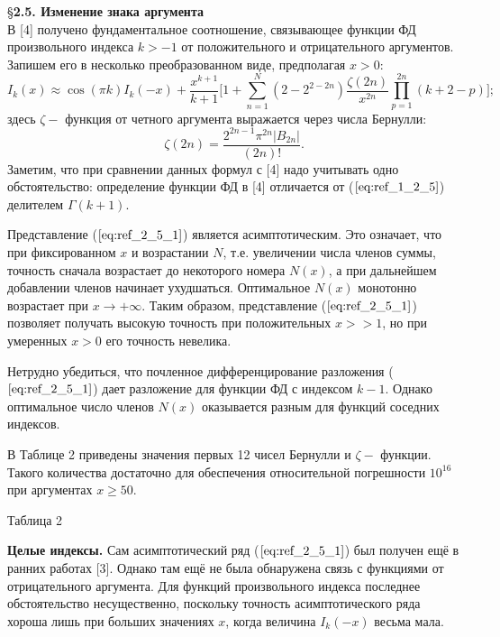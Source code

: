 \S \textbf{2.5. Изменение знака аргумента}
\\

В [4] получено фундаментальное соотношение, связывающее функции ФД
произвольного индекса $k > -1$ от положительного и отрицательного
аргументов. Запишем его в несколько преобразованном виде, предполагая
$x > 0$:
\begin{equation}
I_k(x) \approx \cos(\pi k)I_k(-x)+ \frac{x^{k+1}}{k+1}\Bigg[ 1+\sum\limits_{n=1}^N (2-2^{2-2n}) \frac{\zeta (2n)}{x^{2n}}  \prod\limits_{p=1}^{2n} (k+2-p) \Bigg];
\label{eq:ref_2_5_1}
\end{equation}
здесь $\zeta -$ функция от четного аргумента выражается через числа Бернулли:
\begin{equation}
\zeta(2n)= \frac{2^{2n-1} \pi^{2n} |B_{2n}|}{(2n)!}.
\label{eq:ref_2_5_2}
\end{equation}
Заметим, что при сравнении данных формул с [4] надо учитывать одно
обстоятельство: определение функции ФД в [4] отличается от ($\ref{eq:ref_1_2_5}$) делителем $\Gamma(k + 1)$.

Представление ($\ref{eq:ref_2_5_1}$) является асимптотическим. Это означает, что при
фиксированном $x$ и возрастании $N$, т.е. увеличении числа членов суммы,
точность сначала возрастает до некоторого номера $N(x)$, а при дальнейшем
добавлении членов начинает ухудшаться. Оптимальное $N(x)$ монотонно
возрастает при $x \to +\infty$. Таким образом, представление ($\ref{eq:ref_2_5_1}$) позволяет получать
высокую точность при положительных $x >> 1$, но при умеренных $x > 0$ его
точность невелика.

Нетрудно убедиться, что почленное дифференцирование разложения ($\ref{eq:ref_2_5_1}$)
дает разложение для функции ФД с индексом $k - 1$. Однако оптимальное
число членов $N(x)$ оказывается разным для функций соседних индексов.

В Таблице 2 приведены значения первых 12 чисел Бернулли и
$\zeta -$ функции. Такого количества достаточно для обеспечения относительной
погрешности $10^{16}$ при аргументах $x \geqslant 50$.

Таблица 2 %


\textbf{Целые индексы.} Сам асимптотический ряд ($\ref{eq:ref_2_5_1}$) был получен ещё в ранних
работах [3]. Однако там ещё не была обнаружена связь с функциями от
отрицательного аргумента. Для функций произвольного индекса последнее
обстоятельство несущественно, поскольку точность асимптотического ряда
хороша лишь при больших значениях $x$, когда величина $I_k(-x)$ весьма мала.

